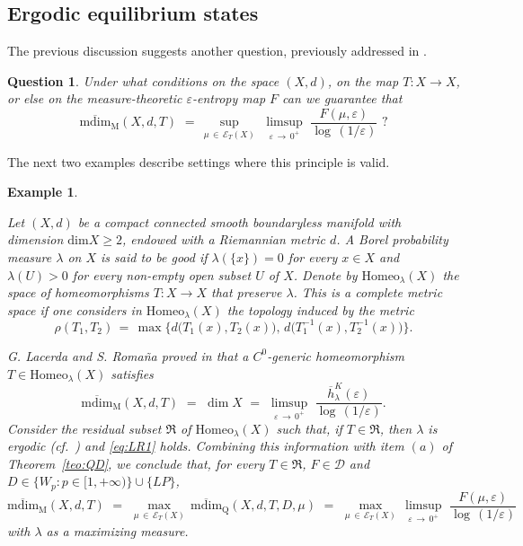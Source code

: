 \documentclass[11pt,a4paper,reqno]{amsart}
\theoremstyle{plain}
\newtheorem{example}[theorem]{Example}
\theoremstyle{definition}
\newtheorem{question}[theorem]{Question}
\newcommand{\ep} {\varepsilon}
\newcommand{\vep}{\varepsilon}
\newcommand{\cD}{{\mathcal D}}
\newcommand{\cE}{{\mathcal E}}
\begin{document}

\subsection{Ergodic equilibrium states}
The previous discussion suggests another question, previously addressed in \cite{EYZ2025}.

\begin{question}
\emph{Under what conditions on the space $(X,d)$, on the map $T\colon X \to X$, or else on the measure-theoretic $\vep$-entropy map $F$ can we guarantee that 
$$\mathrm{\overline{mdim}_M}(X,d,T) \,\, =\, \sup_{\mu\,\in\,\cE_T(X)}\,\,  \limsup_{\vep \, \to \, 0^+} \, \,\frac{F(\mu, \vep)}{\log \,(1/\vep)} \,\,?$$}
\end{question}


The next two examples describe settings where this principle is valid.


\begin{example}\label{ex:LR}

\emph{Let $(X,d)$ be a compact connected smooth boundaryless manifold with dimension $\mathrm{dim} X \geq 2$, endowed with a Riemannian metric $d$. A Borel probability measure $\lambda$ on $X$ is said to be \emph{good} if $\lambda(\{x\}) = 0$ for every $x \in X$ and $\lambda(U) > 0$ for every non-empty open subset $U$ of $X$. Denote by $\mathrm{Homeo}_\lambda(X)$ the space of homeomorphisms $T \colon X \to X$ that preserve $\lambda$. This is a complete metric space if one considers in $\mathrm{Homeo}_\lambda(X)$ the topology induced by the metric
$$\rho(T_1, T_2) \, = \, \max \big\{d\big(T_1(x), T_2(x)\big), \,d\big(T_1^{-1}(x), T_2^{-1}(x)\big)\big\}.$$}

\emph{G. Lacerda and S. Romaña proved in \cite[Theorems~A~\&~B]{LR24} that a $C^0$-generic homeomorphism $T \in \mathrm{Homeo}_\lambda(X)$ satisfies
\begin{equation}\label{eq:LR1}
    \mathrm{\overline{mdim}_M}(X,d,T) \,\, =\,\,\dim X\,\, =\,\, \limsup_{\vep \, \to \, 0^+} \, \,\frac{ \overline{h}_\lambda^K( \vep)}{\log \,(1/\vep)}.
\end{equation}
Consider the residual subset $\mathfrak{R}$ of $\mathrm{Homeo}_\lambda(X)$ such that, if $T \in \mathfrak{R}$, then $\lambda$ is ergodic (cf.~\cite{OU}) and \eqref{eq:LR1} holds. Combining this information with item $(a)$ of Theorem~\ref{teo:QD}, we conclude that, for every $T \in \mathfrak{R}$, $F\in\cD$ and $D \in \{W_p\colon p \in [1,+\infty)\}\cup \{LP\}$, 
$$\mathrm{\overline{mdim}_M}(X,d,T) \,\, = \,\,
 \max_{\mu\,\in\,\cE_T(X)} \,\mathrm{\overline{mdim}_Q}(X,d,T,D,\mu) \,\, = \,\,
 \max_{\mu\,\in\,\cE_T(X)} \,  \limsup_{\vep\,\to\,0^+}\,\, \frac{F(\mu,\ep)}{\log\,(1/\vep)}$$
 with $\lambda$ as a maximizing measure.}
\end{example}
\smallskip
\end{document}
